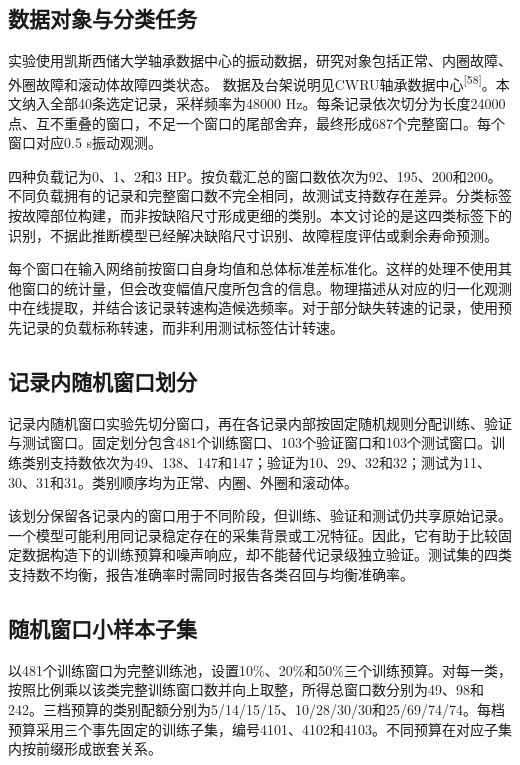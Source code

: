 \documentclass[UTF8,12pt,openany,twoside]{ctexbook}
\numberwithin{equation}{chapter}
\begin{document}
\subsection{数据对象与分类任务}\label{ux6570ux636eux5bf9ux8c61ux4e0eux5206ux7c7bux4efbux52a1}

实验使用凯斯西储大学轴承数据中心的振动数据，研究对象包括正常、内圈故障、外圈故障和滚动体故障四类状态。 数据及台架说明见CWRU轴承数据中心\textsuperscript{[58]}。本文纳入全部40条选定记录，采样频率为48000 Hz。每条记录依次切分为长度24000点、互不重叠的窗口，不足一个窗口的尾部舍弃，最终形成687个完整窗口。每个窗口对应0.5 s振动观测。

四种负载记为0、1、2和3 HP。按负载汇总的窗口数依次为92、195、200和200。不同负载拥有的记录和完整窗口数不完全相同，故测试支持数存在差异。分类标签按故障部位构建，而非按缺陷尺寸形成更细的类别。本文讨论的是这四类标签下的识别，不据此推断模型已经解决缺陷尺寸识别、故障程度评估或剩余寿命预测。

每个窗口在输入网络前按窗口自身均值和总体标准差标准化。这样的处理不使用其他窗口的统计量，但会改变幅值尺度所包含的信息。物理描述从对应的归一化观测中在线提取，并结合该记录转速构造候选频率。对于部分缺失转速的记录，使用预先记录的负载标称转速，而非利用测试标签估计转速。

\subsection{记录内随机窗口划分}\label{ux8bb0ux5f55ux5185ux968fux673aux7a97ux53e3ux5212ux5206}

记录内随机窗口实验先切分窗口，再在各记录内部按固定随机规则分配训练、验证与测试窗口。固定划分包含481个训练窗口、103个验证窗口和103个测试窗口。训练类别支持数依次为49、138、147和147；验证为10、29、32和32；测试为11、30、31和31。类别顺序均为正常、内圈、外圈和滚动体。

该划分保留各记录内的窗口用于不同阶段，但训练、验证和测试仍共享原始记录。一个模型可能利用同记录稳定存在的采集背景或工况特征。因此，它有助于比较固定数据构造下的训练预算和噪声响应，却不能替代记录级独立验证。测试集的四类支持数不均衡，报告准确率时需同时报告各类召回与均衡准确率。

\subsection{随机窗口小样本子集}\label{ux968fux673aux7a97ux53e3ux5c0fux6837ux672cux5b50ux96c6}

以481个训练窗口为完整训练池，设置10\%、20\%和50\%三个训练预算。对每一类，按照比例乘以该类完整训练窗口数并向上取整，所得总窗口数分别为49、98和242。三档预算的类别配额分别为5/14/15/15、10/28/30/30和25/69/74/74。每档预算采用三个事先固定的训练子集，编号4101、4102和4103。不同预算在对应子集内按前缀形成嵌套关系。
\end{document}
